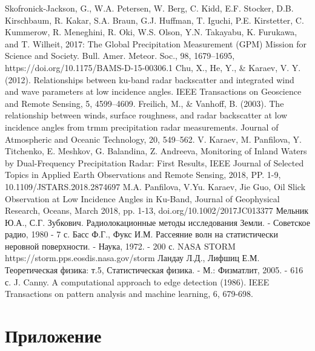 \newpage
{}
\begin{thebibliography}{99}
 Skofronick-Jackson, G., W.A. Petersen, W. Berg, C. Kidd,
E.F. Stocker, D.B. Kirschbaum, R. Kakar, S.A. Braun, G.J. Huffman, T. Iguchi, P.E. Kirstetter, C. Kummerow, R.
Meneghini, R. Oki, W.S. Olson, Y.N. Takayabu, K. Furukawa, and T. Wilheit, 2017: The Global Precipitation Measurement
(GPM) Mission for Science and Society. Bull. Amer. Meteor. Soc., 98, 1679–1695,
https://doi.org/10.1175/BAMS-D-15-00306.1 
 Chu, X., He, Y., \& Karaev, V. Y. (2012). Relationships between ku-band
radar backscatter and integrated wind and wave parameters at low incidence angles. IEEE Transactions on Geoscience and
Remote Sensing, 5, 4599–4609.
 Freilich, M., \& Vanhoff, B. (2003). The relationship between winds, surface roughness, and radar
backscatter at low incidence angles from trmm precipitation radar measurements. Journal of Atmospheric and Oceanic
Technology, 20, 549–562.
 V. Karaev, M. Panfilova, Y. Titchenko, E. Meshkov, G. Balandina, Z. Andreeva, Monitoring of Inland Waters
by Dual-Frequency Precipitation Radar: First Results, IEEE Journal
of Selected Topics in Applied Earth Observations and Remote Sensing, 2018, PP. 1-9, 10.1109/JSTARS.2018.2874697
 M.A. Panfilova, V.Yu. Karaev, Jie Guo, Oil Slick Observation at Low Incidence Angles in Ku-Band, Journal of Geophysical Research,
Oceans, March 2018, pp. 1-13, doi.org/10.1002/2017JC013377
 Мельник Ю.А., С.Г. Зубкович. Радиолокационные методы исследования Земли. - Советское радио, 1980 - 7 с.
 Басс Ф.Г., Фукс И.М. Рассеяние волн на статистически неровной поверхности. - Наука, 1972. - 200 с.
 NASA STORM https://storm.pps.eosdis.nasa.gov/storm
 Ландау Л.Д., Лифшиц Е.М. Теоретическая физика: т.5, Статистическая физика. - М.: Физматлит, 2005. - 616 с.
 J. Canny. A computational approach to edge detection (1986). IEEE Transactions on pattern analysis and machine
learning, 6, 679-698.
\end{thebibliography}

\newpage
{}
\section*{Приложение}

